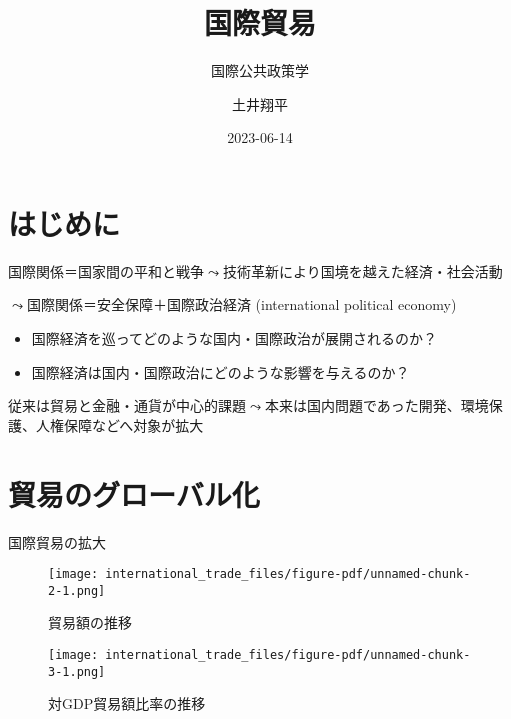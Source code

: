\documentclass[
  xelatex,
  ja=standard]{bxjsarticle}
\title{国際貿易}
\subtitle{国際公共政策学}
\author{土井翔平}
\date{2023-06-14}
\providecommand{\tightlist}{%
  \setlength{\itemsep}{0pt}\setlength{\parskip}{0pt}}\usepackage{longtable,booktabs,array}
\begin{document}
\maketitle
\ifdefined\Shaded\renewenvironment{Shaded}{\begin{tcolorbox}[frame hidden, boxrule=0pt, enhanced, interior hidden, borderline west={3pt}{0pt}{shadecolor}, sharp corners, breakable]}{\end{tcolorbox}}\fi

\hypertarget{ux306fux3058ux3081ux306b}{%
\section*{はじめに}\label{ux306fux3058ux3081ux306b}}

国際関係＝国家間の平和と戦争\(\leadsto\)技術革新により国境を越えた経済・社会活動

\(\leadsto\)国際関係＝安全保障＋国際政治経済 (international political
economy)

\begin{itemize}
\tightlist
\item
  国際経済を巡ってどのような国内・国際政治が展開されるのか？
\item
  国際経済は国内・国際政治にどのような影響を与えるのか？
\end{itemize}

従来は貿易と金融・通貨が中心的課題\(\leadsto\)本来は国内問題であった開発、環境保護、人権保障などへ対象が拡大

\hypertarget{ux8cbfux6613ux306eux30b0ux30edux30fcux30d0ux30ebux5316}{%
\section{貿易のグローバル化}\label{ux8cbfux6613ux306eux30b0ux30edux30fcux30d0ux30ebux5316}}

国際貿易の拡大

\begin{figure}[htpb]

{\centering \texttt{[image: international\_trade\_files/figure-pdf/unnamed-chunk-2-1.png]}

}

\caption{貿易額の推移}

\end{figure}

\begin{figure}[htpb]

{\centering \texttt{[image: international\_trade\_files/figure-pdf/unnamed-chunk-3-1.png]}

}

\caption{対GDP貿易額比率の推移}

\end{figure}
\end{document}
